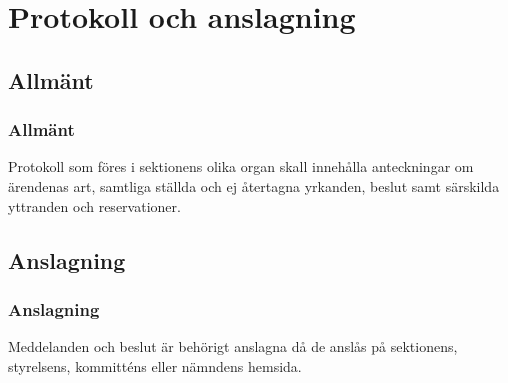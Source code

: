 \section{Protokoll och anslagning}

\subsection{Allmänt}

\subsubsection{Allmänt}
Protokoll som föres i sektionens olika organ skall innehålla anteckningar om ärendenas art, samtliga ställda och ej återtagna yrkanden, beslut samt särskilda yttranden och reservationer.

\subsection{Anslagning}
\label{sec:protokoll:anslagning}

\subsubsection{Anslagning}
Meddelanden och beslut är behörigt anslagna då de anslås på sektionens, styrelsens, kommitténs eller nämndens hemsida.